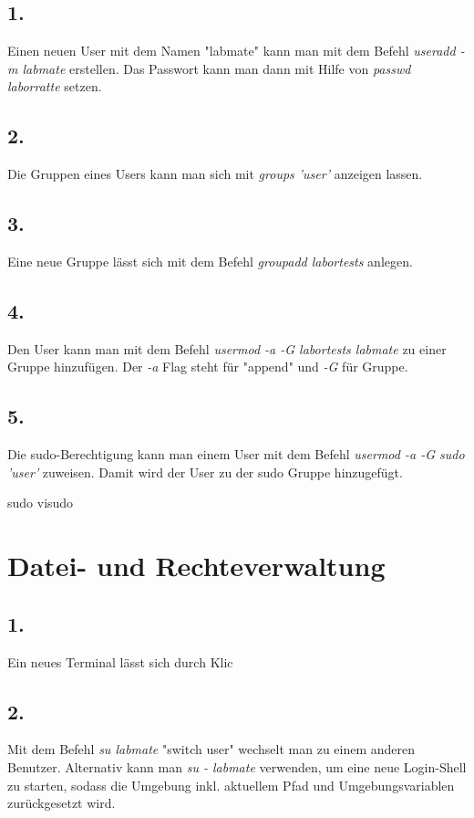 \documentclass[
    fontsize=12pt,
    headings=small,
    parskip=half,           %
    bibliography=totoc,
    numbers=noenddot,       %
    open=any,               %
    ]{scrreprt}
\begin{document}
\subsection*{1.}
Einen neuen User mit dem Namen "labmate" kann man mit dem Befehl \emph{useradd -m labmate} erstellen. Das Passwort kann man dann mit Hilfe von \emph{passwd laborratte} setzen.

\subsection*{2.}
Die Gruppen eines Users kann man sich mit \emph{groups 'user'} anzeigen lassen.

\subsection*{3.}
Eine neue Gruppe lässt sich mit dem Befehl \emph{groupadd labortests} anlegen.

\subsection*{4.}
Den User kann man mit dem Befehl \emph{usermod -a -G labortests labmate} zu einer Gruppe hinzufügen. Der \emph{-a} Flag steht für "append" und \emph{-G} für Gruppe.

\subsection*{5.}
Die sudo-Berechtigung kann man einem User mit dem Befehl \emph{usermod -a -G sudo 'user'} zuweisen. Damit wird der User zu der sudo Gruppe hinzugefügt.

sudo visudo

\section{Datei- und Rechteverwaltung}

\subsection*{1.}
Ein neues Terminal lässt sich durch Klic

\subsection*{2.}
Mit dem Befehl \emph{su labmate} "switch user" wechselt man zu einem anderen Benutzer. Alternativ kann man \emph{su - labmate} verwenden, um eine neue Login-Shell zu starten, sodass die Umgebung inkl. aktuellem Pfad und Umgebungsvariablen zurückgesetzt wird.
\end{document}
